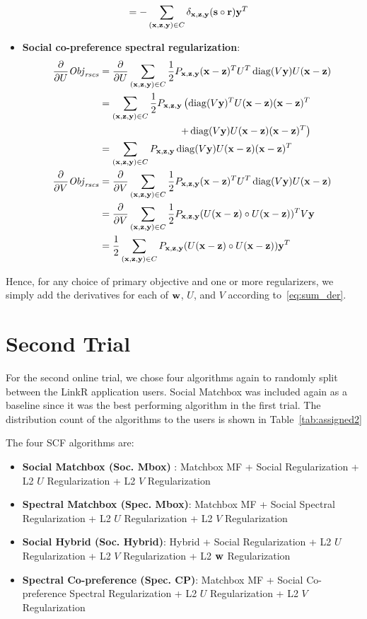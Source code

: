 \begin{itemize}
\begin{align*}
 & = - \sum_{(\mathbf{x},\mathbf{z},\mathbf{y}) \in C} \delta_{\mathbf{x},\mathbf{z},\mathbf{y}} (\mathbf{s} \circ \mathbf{r}) \mathbf{y}^T
\end{align*}
\item {\bf Social co-preference spectral regularization}:
\begin{align*}
\frac{\partial}{\partial U} \mathit{Obj}_{\mathit{rscs}} & = \frac{\partial}{\partial U} \sum_{(\mathbf{x},\mathbf{z},\mathbf{y}) \in C} \frac{1}{2} P_{\mathbf{x},\mathbf{z},\mathbf{y}} (\mathbf{x} - \mathbf{z})^T U^T \operatorname{diag}(V\mathbf{y}) U (\mathbf{x} - \mathbf{z})\\
& = \sum_{(\mathbf{x},\mathbf{z},\mathbf{y}) \in C} \frac{1}{2} P_{\mathbf{x},\mathbf{z},\mathbf{y}} \left( \operatorname{diag}(V\mathbf{y})^T U (\mathbf{x} - \mathbf{z}) (\mathbf{x} - \mathbf{z})^T \right.\\
& \left. \qquad \qquad \qquad \qquad + \operatorname{diag}(V\mathbf{y}) U (\mathbf{x} - \mathbf{z}) (\mathbf{x} - \mathbf{z})^T \right)\\
& = \sum_{(\mathbf{x},\mathbf{z},\mathbf{y}) \in C} P_{\mathbf{x},\mathbf{z},\mathbf{y}} \operatorname{diag}(V\mathbf{y}) U (\mathbf{x} - \mathbf{z}) (\mathbf{x} - \mathbf{z})^T\\
\frac{\partial}{\partial V} \mathit{Obj}_{\mathit{rscs}} & = \frac{\partial}{\partial V} \sum_{(\mathbf{x},\mathbf{z},\mathbf{y}) \in C} \frac{1}{2} P_{\mathbf{x},\mathbf{z},\mathbf{y}} (\mathbf{x} - \mathbf{z})^T U^T \operatorname{diag}(V\mathbf{y}) U (\mathbf{x} - \mathbf{z})\\
& = \frac{\partial}{\partial V} \sum_{(\mathbf{x},\mathbf{z},\mathbf{y}) \in C} \frac{1}{2} P_{\mathbf{x},\mathbf{z},\mathbf{y}} (U(\mathbf{x}-\mathbf{z}) \circ U(\mathbf{x}-\mathbf{z}))^T V\mathbf{y}\\
& = \frac{1}{2} \sum_{(\mathbf{x},\mathbf{z},\mathbf{y}) \in C} P_{\mathbf{x},\mathbf{z},\mathbf{y}} (U(\mathbf{x}-\mathbf{z}) \circ U(\mathbf{x}-\mathbf{z})) \mathbf{y}^T
\end{align*}
\end{itemize}

Hence, for any choice of primary objective and one or more regularizers,
we simply add the derivatives for each of $\mathbf{w}$, $U$, and $V$
according to~\eqref{eq:sum_der}.

\section{Second Trial}

For the second online trial, we chose four algorithms again to randomly split between the LinkR application users. Social Matchbox was included again as a baseline since it was the best performing algorithm in the first trial. The distribution count of the algorithms to the users is shown in Table~\ref{tab:assigned2}

The four SCF algorithms are:

\begin{itemize}
\item{{\bf Social Matchbox (Soc. Mbox)} : Matchbox MF + Social Regularization +  L2 $U$ Regularization + L2 $V$ Regularization}
\item{{\bf Spectral Matchbox (Spec. Mbox)}: Matchbox MF + Social Spectral Regularization + L2 $U$ Regularization + L2 $V$ Regularization}
\item{{\bf Social Hybrid (Soc. Hybrid)}: Hybrid + Social Regularization + L2 $U$ Regularization + L2 $V$ Regularization + L2 $\mathbf{w}$ Regularization}
\item{{\bf Spectral Co-preference (Spec. CP)}: Matchbox MF + Social Co-preference Spectral Regularization + L2 $U$ Regularization + L2 $V$ Regularization}
\end{itemize}

